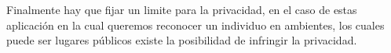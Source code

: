 Finalmente hay que fijar un limite para la privacidad, en el caso de estas aplicación en la cual queremos reconocer un individuo en ambientes, los cuales puede ser lugares públicos existe la posibilidad de infringir la privacidad.




